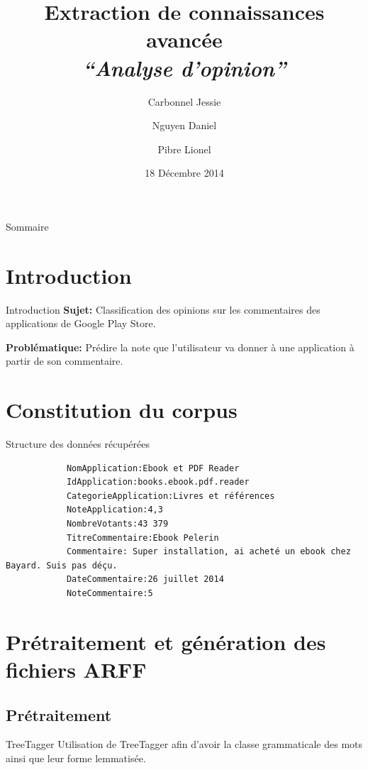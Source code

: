 \documentclass{beamer}
\title[Classification de documents]{Extraction de connaissances avancée\\ \emph{``Analyse d'opinion''}}
\author{Carbonnel Jessie \and Nguyen Daniel \and Pibre Lionel}
\institute[UM2]{Université de Montpellier 2}
\date{18 Décembre 2014}
\begin{document}
\begin{frame}
\titlepage
\end{frame}

\begin{frame}{Sommaire}
	\tableofcontents[hidesubsections]
\end{frame}
\section{Introduction}
\begin{frame}
	\begin{block}{Introduction}
		\textbf{Sujet:} Classification des opinions sur les commentaires des applications de Google Play Store.		
		
		\vspace{0.5cm}
		
		\textbf{Problématique:} Prédire la note que l'utilisateur va donner à une application à partir de son commentaire.
			
	\end{block}
\end{frame}

\section{Constitution du corpus}
\begin{frame}
	\begin{block}{Structure des données récupérées}
		\begin{verbatim}
			NomApplication:Ebook et PDF Reader
			IdApplication:books.ebook.pdf.reader
			CategorieApplication:Livres et références
			NoteApplication:4,3
			NombreVotants:43 379
			TitreCommentaire:Ebook Pelerin
			Commentaire: Super installation, ai acheté un ebook chez Bayard. Suis pas déçu.
			DateCommentaire:26 juillet 2014
			NoteCommentaire:5
		\end{verbatim}
	\end{block}
\end{frame}

\section{Prétraitement et génération des fichiers ARFF}
\subsection{Prétraitement}
\begin{frame}
	\begin{block}{TreeTagger}
		Utilisation de TreeTagger afin d'avoir la classe grammaticale des mots ainsi que leur forme lemmatisée.
	\end{block}
	
\end{frame}
\end{document}
